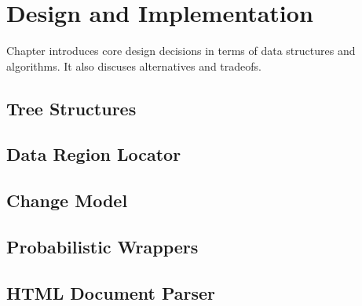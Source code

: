 \chapter{Design and Implementation}


Chapter introduces core design decisions in terms of data structures and algorithms. It also discuses alternatives and tradeofs.

\section{Tree Structures}
\section{Data Region Locator}
\section{Change Model}
\section{Probabilistic Wrappers}
\section{HTML Document Parser}


